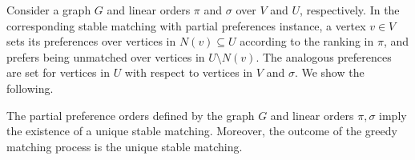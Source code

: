 Consider a graph $G$ and linear orders $\pi$ and $\sigma$ over $V$ and $U$, respectively. In the corresponding stable matching with partial preferences instance, a vertex $v\in V$ sets its preferences over vertices in $N(v)\subseteq U$ according to the ranking in $\pi$, and prefers being unmatched over vertices in $U\setminus N(v)$. The analogous preferences are set for vertices in $U$ with respect to vertices in $V$ and $\sigma$. 
%
%
%
%
%
%
%
%
%
%
%
%
%
%
%
%
%
%
%
%
We show the following.

\begin{proposition}
	The partial preference orders defined by the graph $G$ and linear orders $\pi,\sigma$ imply the existence of a unique stable matching. 
	Moreover, the outcome of the greedy matching process is the unique stable matching. 
\end{proposition}

